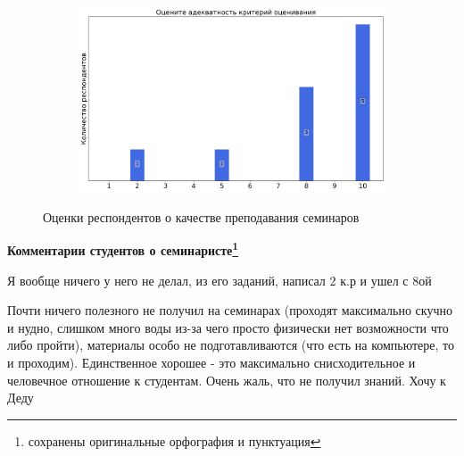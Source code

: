 \begin{figure}[H]
\begin{subfigure}[b]{0.45\textwidth}
			\end{subfigure}
			\begin{subfigure}[b]{0.45\textwidth}
				\centering
				\includegraphics[width=\textwidth]{images/1 course/Информатика/seminarists-marks-Хохлов В.К.-3.png}
			\end{subfigure}	
			\caption{Оценки респондентов о качестве преподавания семинаров}
		\end{figure}

		\textbf{Комментарии студентов о семинаристе\protect\footnote{сохранены оригинальные орфография и пунктуация}}
            \begin{commentbox} 
                Я вообще ничего у него не делал, из его заданий, написал 2 к.р и ушел с 8ой 
            \end{commentbox} 
        
            \begin{commentbox} 
                Почти ничего полезного не получил на семинарах (проходят максимально скучно и нудно, слишком много воды из-за чего просто физически нет возможности что либо пройти), материалы особо не подготавливаются (что есть на компьютере, то и проходим). Единственное хорошее - это максимально снисходительное и человечное отношение к студентам. Очень жаль, что не получил знаний. Хочу к Деду 
            \end{commentbox}

    
